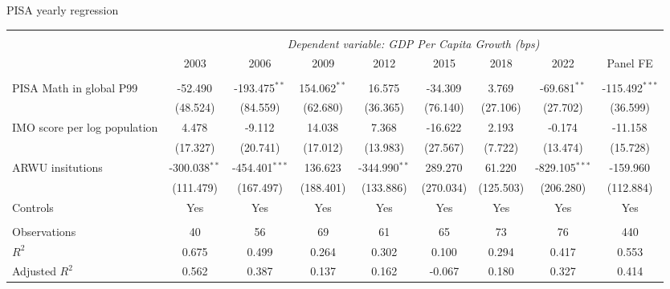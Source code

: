 \documentclass[10pt]{beamer}
\begin{document}
\begin{frame}{PISA yearly regression}
    \begin{table}[!htbp] \centering
        \resizebox{\linewidth}{!} {
            \begin{tabular}{@{\extracolsep{1pt}}lcccccccc}
                \\[-1.8ex]\hline
                \hline \\[-1.8ex]
                & \multicolumn{8}{c}{\textit{Dependent variable: GDP Per Capita Growth (bps)}} \
                \cr \cline{2-9}
                \\[-1.8ex] & \multicolumn{1}{c}{2003} & \multicolumn{1}{c}{2006} & \multicolumn{1}{c}{2009} & \multicolumn{1}{c}{2012} & \multicolumn{1}{c}{2015} & \multicolumn{1}{c}{2018} & \multicolumn{1}{c}{2022} & \multicolumn{1}{c}{Panel FE}  \\
                \hline \\[-1.8ex]
                 PISA Math in global P99 & -52.490$^{}$ & -193.475$^{**}$ & 154.062$^{**}$ & 16.575$^{}$ & -34.309$^{}$ & 3.769$^{}$ & -69.681$^{**}$ & -115.492$^{***}$ \\
                & (48.524) & (84.559) & (62.680) & (36.365) & (76.140) & (27.106) & (27.702) & (36.599) \\
                 IMO score per log population & 4.478$^{}$ & -9.112$^{}$ & 14.038$^{}$ & 7.368$^{}$ & -16.622$^{}$ & 2.193$^{}$ & -0.174$^{}$ & -11.158$^{}$ \\
                & (17.327) & (20.741) & (17.012) & (13.983) & (27.567) & (7.722) & (13.474) & (15.728) \\
                 ARWU insitutions & -300.038$^{**}$ & -454.401$^{***}$ & 136.623$^{}$ & -344.990$^{**}$ & 289.270$^{}$ & 61.220$^{}$ & -829.105$^{***}$ & -159.960$^{}$ \\
                & (111.479) & (167.497) & (188.401) & (133.886) & (270.034) & (125.503) & (206.280) & (112.884) \\
                Controls & Yes & Yes & Yes & Yes & Yes & Yes & Yes & Yes \\
                \hline \\[-1.8ex]
                 Observations & 40 & 56 & 69 & 61 & 65 & 73 & 76 & 440 \\
                 $R^2$ & 0.675 & 0.499 & 0.264 & 0.302 & 0.100 & 0.294 & 0.417 & 0.553 \\
                 Adjusted $R^2$ & 0.562 & 0.387 & 0.137 & 0.162 & -0.067 & 0.180 & 0.327 & 0.414 \\

\end{tabular}}
\end{table}
\end{frame}
\end{document}
